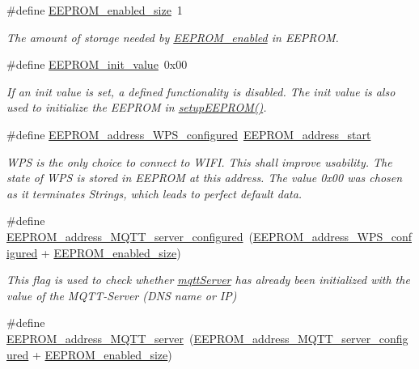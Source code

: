 \begin{DoxyCompactItemize}
\#define \hyperlink{WIFIOnOff_8ino_a11fbf1b754b9209b6bdd4ebcb0c3e677}{E\-E\-P\-R\-O\-M\-\_\-enabled\-\_\-size}~1
\begin{DoxyCompactList}\small\item\em The amount of storage needed by \hyperlink{WIFIOnOff_8ino_a06c93cd8175c0a438c20922e313645bd}{E\-E\-P\-R\-O\-M\-\_\-enabled} in E\-E\-P\-R\-O\-M. \end{DoxyCompactList}\item 
\#define \hyperlink{WIFIOnOff_8ino_a6912b1d0bb01613405a6827632e6d6f4}{E\-E\-P\-R\-O\-M\-\_\-init\-\_\-value}~0x00
\begin{DoxyCompactList}\small\item\em If an init value is set, a defined functionality is disabled. The init value is also used to initialize the E\-E\-P\-R\-O\-M in \hyperlink{WIFIOnOff_8ino_a3d5cf434e34fce7db249185369616a32}{setup\-E\-E\-P\-R\-O\-M()}. \end{DoxyCompactList}\item 
\#define \hyperlink{WIFIOnOff_8ino_ad4bdfcba39f823c70e99abea4dc16ffb}{E\-E\-P\-R\-O\-M\-\_\-address\-\_\-\-W\-P\-S\-\_\-configured}~\hyperlink{WIFIOnOff_8ino_a4e45a9ad8583fe2db7f42052e0a7ac95}{E\-E\-P\-R\-O\-M\-\_\-address\-\_\-start}
\begin{DoxyCompactList}\small\item\em W\-P\-S is the only choice to connect to W\-I\-F\-I. This shall improve usability. The state of W\-P\-S is stored in E\-E\-P\-R\-O\-M at this address. The value 0x00 was chosen as it terminates Strings, which leads to perfect default data. \end{DoxyCompactList}\item 
\#define \hyperlink{WIFIOnOff_8ino_a604b9f83bce537df8060d5bb69480c76}{E\-E\-P\-R\-O\-M\-\_\-address\-\_\-\-M\-Q\-T\-T\-\_\-server\-\_\-configured}~(\hyperlink{WIFIOnOff_8ino_ad4bdfcba39f823c70e99abea4dc16ffb}{E\-E\-P\-R\-O\-M\-\_\-address\-\_\-\-W\-P\-S\-\_\-configured} + \hyperlink{WIFIOnOff_8ino_a11fbf1b754b9209b6bdd4ebcb0c3e677}{E\-E\-P\-R\-O\-M\-\_\-enabled\-\_\-size})
\begin{DoxyCompactList}\small\item\em This flag is used to check whether \hyperlink{WIFIOnOff_8ino_a020889fcca6224d14f4d3f4241ca4467}{mqtt\-Server} has already been initialized with the value of the M\-Q\-T\-T-\/\-Server (D\-N\-S name or I\-P) \end{DoxyCompactList}\item 
\#define \hyperlink{WIFIOnOff_8ino_add6dd801239610f299da096ea9b87383}{E\-E\-P\-R\-O\-M\-\_\-address\-\_\-\-M\-Q\-T\-T\-\_\-server}~(\hyperlink{WIFIOnOff_8ino_a604b9f83bce537df8060d5bb69480c76}{E\-E\-P\-R\-O\-M\-\_\-address\-\_\-\-M\-Q\-T\-T\-\_\-server\-\_\-configured} + \hyperlink{WIFIOnOff_8ino_a11fbf1b754b9209b6bdd4ebcb0c3e677}{E\-E\-P\-R\-O\-M\-\_\-enabled\-\_\-size})

\end{DoxyCompactItemize}

